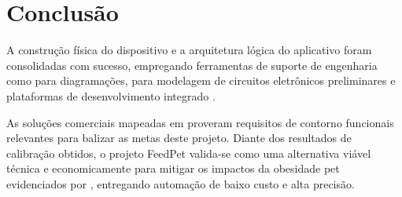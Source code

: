 \documentclass[12pt]{article}
\begin{document}
\section{Conclusão}

A construção física do dispositivo e a arquitetura lógica do aplicativo foram consolidadas com sucesso, empregando ferramentas de suporte de engenharia como \cite{mermaid:26} para diagramações, \cite{tinkercad:23} para modelagem de circuitos eletrônicos preliminares e plataformas de desenvolvimento integrado \cite{blueoprint:26, pandasuite:26}. 

As soluções comerciais mapeadas em \cite{onizoomi:26, surecare:26} proveram requisitos de contorno funcionais relevantes para balizar as metas deste projeto. Diante dos resultados de calibração obtidos, o projeto FeedPet valida-se como uma alternativa viável técnica e economicamente para mitigar os impactos da obesidade pet evidenciados por \cite{folha:23}, entregando automação de baixo custo e alta precisão.
\end{document}
